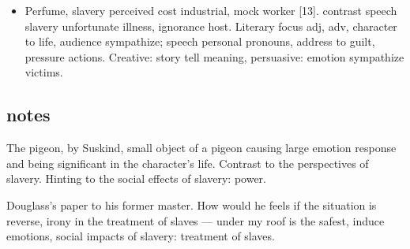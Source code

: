 \documentclass[a4paper,12pt]{article}
\begin{document}
\begin{itemize}
 \item Perfume, slavery perceived cost industrial, mock worker [13]. contrast speech slavery unfortunate illness, ignorance host. Literary focus adj, adv, character to life, audience sympathize; speech personal pronouns, address to guilt, pressure actions. Creative: story tell meaning, persuasive: emotion sympathize victims.
\end{itemize}

\newpage
\subsection*{notes}

The pigeon, by Suskind, small object of a pigeon causing large emotion response and being significant in the character's life. Contrast to the perspectives of slavery. Hinting to the social effects of slavery: power.

Douglass's paper to his former master. How would he feels if the situation is reverse, irony in the treatment of slaves --- under my roof is the safest, induce emotions, social impacts of slavery: treatment of slaves.
\end{document}
